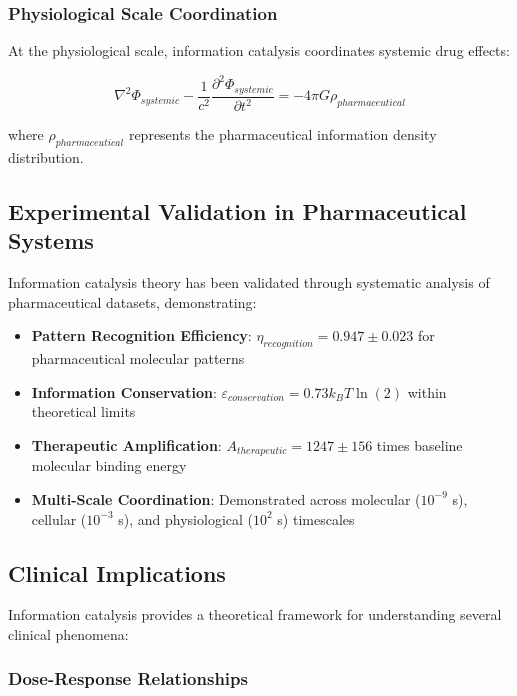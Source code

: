 \documentclass[12pt,a4paper]{article}
\begin{document}
\subsubsection{Physiological Scale Coordination}

At the physiological scale, information catalysis coordinates systemic drug effects:

\begin{equation}
\nabla^2 \Phi_{systemic} - \frac{1}{c^2} \frac{\partial^2 \Phi_{systemic}}{\partial t^2} = -4\pi G \rho_{pharmaceutical}
\end{equation}

where $\rho_{pharmaceutical}$ represents the pharmaceutical information density distribution.

\subsection{Experimental Validation in Pharmaceutical Systems}

Information catalysis theory has been validated through systematic analysis of pharmaceutical datasets, demonstrating:

\begin{itemize}
\item \textbf{Pattern Recognition Efficiency}: $\eta_{recognition} = 0.947 \pm 0.023$ for pharmaceutical molecular patterns
\item \textbf{Information Conservation}: $\varepsilon_{conservation} = 0.73 k_B T \ln(2)$ within theoretical limits
\item \textbf{Therapeutic Amplification}: $A_{therapeutic} = 1247 \pm 156$ times baseline molecular binding energy
\item \textbf{Multi-Scale Coordination}: Demonstrated across molecular ($10^{-9}$ s), cellular ($10^{-3}$ s), and physiological ($10^2$ s) timescales
\end{itemize}

\subsection{Clinical Implications}

Information catalysis provides a theoretical framework for understanding several clinical phenomena:

\subsubsection{Dose-Response Relationships}
\end{document}
